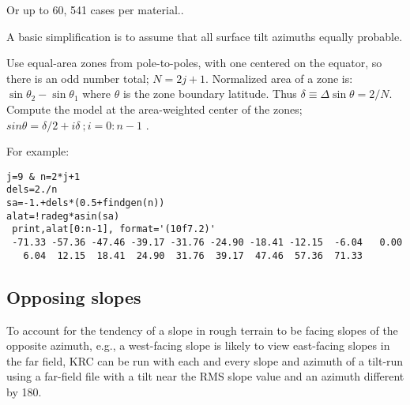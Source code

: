 \documentclass{article}
\begin{document}
Or up to 60\qd, 541 cases per material..

A basic simplification is to assume that all surface tilt azimuths equally probable.
 
Use equal-area zones from pole-to-poles, with one centered on the equator, so
there is an odd number total; $N=2j+1$.  Normalized area of a zone is: $\sin
\theta_2 - \sin \theta_1$ where $\theta$ is the zone boundary latitude. Thus
$\delta \equiv \Delta \sin \theta = 2/N $.  Compute the model at the
area-weighted center of the zones; $sin \theta= \delta/2+i \delta \ ; i=0:n-1$ .

 For example:
\begin{verbatim}
j=9 & n=2*j+1
dels=2./n
sa=-1.+dels*(0.5+findgen(n))
alat=!radeg*asin(sa)
 print,alat[0:n-1], format='(10f7.2)'
 -71.33 -57.36 -47.46 -39.17 -31.76 -24.90 -18.41 -12.15  -6.04   0.00
   6.04  12.15  18.41  24.90  31.76  39.17  47.46  57.36  71.33  
\end{verbatim}
\subsection{Opposing slopes}
 To account for the tendency of a slope in rough terrain to be facing slopes of
 the opposite azimuth, e.g., a west-facing slope  is likely to view
 east-facing slopes in the far field, KRC can be run with each and every
 slope and azimuth of a tilt-run using a far-field file with a tilt near the RMS
 slope value and an azimuth different by 180\qd.
\end{document}
